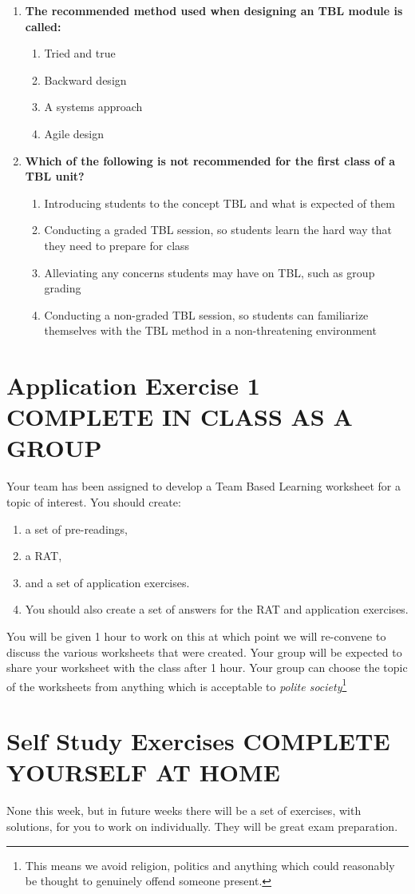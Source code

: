 \documentclass[twoside=false,DIV=14]{scrartcl}
\begin{document}
\begin{enumerate}
\item \textbf{The recommended method used when designing an TBL module is called:}
\begin{enumerate}
    \item Tried and true
    \item Backward design
    \item A systems approach
    \item Agile design
\end{enumerate}

\item \textbf{Which of the following is not recommended for the first class of a TBL unit?}
\begin{enumerate}
    \item Introducing students to the concept TBL and what is expected of them
    \item Conducting a graded TBL session, so students learn the hard way that they need to prepare for class
    \item Alleviating any concerns students may have on TBL, such as group grading
    \item Conducting a non-graded TBL session, so students can familiarize themselves with the TBL method in a non-threatening environment
\end{enumerate}
\end{enumerate}

\newpage
\part*{Application Exercise 1 \hspace{1em} {\small COMPLETE IN CLASS AS A GROUP}}
Your team has been assigned to develop a Team Based Learning worksheet for a topic of interest.  You should create:
\begin{enumerate}
\item a set of pre-readings, 
\item a RAT, 
\item and a set of application exercises.  
\item You should also create a set of answers for the RAT and application exercises.
\end{enumerate}

You will be given 1 hour to work on this at which point we will re-convene to discuss the various worksheets that were created.  Your group will be expected to share your worksheet with the class after 1 hour.  Your group can choose the topic of the worksheets from anything which is acceptable to \emph{polite society}\footnote{This means we avoid religion, politics and anything which could reasonably be thought to genuinely offend someone present.}
\newpage
\part*{Self Study Exercises \hspace{2em} {\small COMPLETE YOURSELF AT HOME}}
None this week, but in future weeks there will be a set of exercises, with solutions, for you to work on individually.  They will be great exam preparation.
\end{document}
